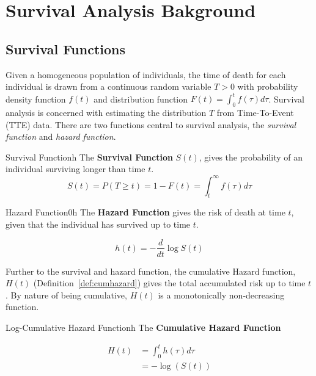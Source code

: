 \chapter{Survival Analysis Bakground}\label{survchap}

\section{Survival Functions}

Given a homogeneous population of individuals, the time of death for each individual is drawn from a continuous random variable $T > 0$ with probability density function $f(t)$ and distribution function $F(t) = \int_{0}^{t}f(\tau)d\tau$. Survival analysis is concerned with estimating the distribution $T$ from Time-To-Event (TTE) data. There are two functions central to survival analysis, the \textit{survival function} and \textit{hazard function}.

\begin{definition}{Survival Function}{h}
    The \textbf{Survival Function} $S(t)$, gives the probability of an individual surviving longer than time $t$. 
    \begin{equation}
        S(t) = P(T \geq  t) = 1 - F(t) = \int_{t}^{\infty}f(\tau)d\tau  
    \end{equation}
\end{definition}

\begin{definition}{Hazard Function0}{h}
    The \textbf{Hazard Function} gives the risk of death at time $t$, given that the individual has survived up to time $t$. 
    
    \begin{equation}
        h(t) = -\frac{d}{dt}\log S(t)  
    \end{equation}
\end{definition}

Further to the survival and hazard function, the cumulative Hazard function, $H(t)$ (Definition~\ref{def:cumhazard}) gives the total accumulated risk up to time $t$. By nature of being cumulative, $H(t)$ is a monotonically non-decreasing function. 

\begin{definition}{Log-Cumulative Hazard Function}{h}
    The \textbf{Cumulative Hazard Function} 
    
    \begin{align}
        H(t) &= \int_0^t h(\tau)d\tau \\
             &= -\log (S(t))
    \end{align}
    \label{def:cumhazard}
\end{definition}

